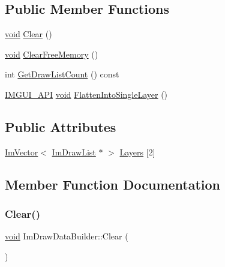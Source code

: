 \subsection*{Public Member Functions}
\begin{DoxyCompactItemize}
\item 
\hyperlink{imgui__impl__opengl3__loader_8h_ac668e7cffd9e2e9cfee428b9b2f34fa7}{void} \hyperlink{structImDrawDataBuilder_a5306e78438b48a74f2d65d0e10d36d53}{Clear} ()
\item 
\hyperlink{imgui__impl__opengl3__loader_8h_ac668e7cffd9e2e9cfee428b9b2f34fa7}{void} \hyperlink{structImDrawDataBuilder_a469040fce189f1225043171a3b58420d}{Clear\+Free\+Memory} ()
\item 
int \hyperlink{structImDrawDataBuilder_aeddff40f1bb595a44c909f94d2f1fe46}{Get\+Draw\+List\+Count} () const
\item 
\hyperlink{imgui_8h_a43829975e84e45d1149597467a14bbf5}{I\+M\+G\+U\+I\+\_\+\+A\+PI} \hyperlink{imgui__impl__opengl3__loader_8h_ac668e7cffd9e2e9cfee428b9b2f34fa7}{void} \hyperlink{structImDrawDataBuilder_a3893445f97c62e9755fa61e37b698487}{Flatten\+Into\+Single\+Layer} ()
\end{DoxyCompactItemize}
\subsection*{Public Attributes}
\begin{DoxyCompactItemize}
\item 
\hyperlink{structImVector}{Im\+Vector}$<$ \hyperlink{structImDrawList}{Im\+Draw\+List} $\ast$ $>$ \hyperlink{structImDrawDataBuilder_a2d03f8c80dac68fc0e2565dd79307dea}{Layers} \mbox{[}2\mbox{]}
\end{DoxyCompactItemize}


\subsection{Member Function Documentation}
\mbox{\label{structImDrawDataBuilder_a5306e78438b48a74f2d65d0e10d36d53}} 
\subsubsection{\texorpdfstring{Clear()}{Clear()}}
{\footnotesize\ttfamily \hyperlink{imgui__impl__opengl3__loader_8h_ac668e7cffd9e2e9cfee428b9b2f34fa7}{void} Im\+Draw\+Data\+Builder\+::\+Clear (\begin{DoxyParamCaption}{ }\end{DoxyParamCaption})\hspace{0.3cm}{\ttfamily [inline]}}

